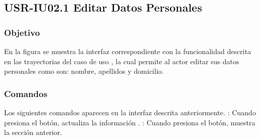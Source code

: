 \clearpage
\subsection{USR-IU02.1 Editar Datos Personales}

\subsubsection{Objetivo}
En la figura  se muestra la interfaz correspondiente con la funcionalidad descrita en las
trayectorias del caso de uso  , la cual permite al actor editar sus datos personales como son: nombre, apellidos y domicilio.

\subsubsection{Comandos}
Los siguientes comandos aparecen en la interfaz descrita anteriormente.
\Titem {} : Cuando presiona el botón, actualiza la información .
\Titem {} : Cuando presiona el botón, muestra la sección anterior.%



\clearpage
